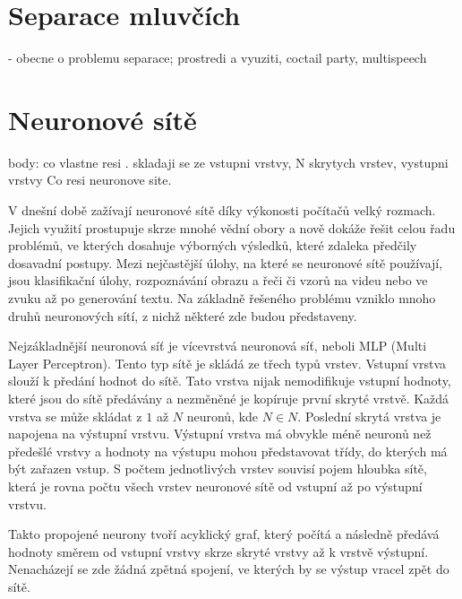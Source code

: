 
\chapter{Separace mluvčích}
\label{separacemluvcich}
- obecne o problemu separace; prostredi a vyuziti, coctail party, multispeech

\chapter{Neuronové sítě}
\label{neuronovky}
body: co vlastne resi . skladaji se ze vstupni vrstvy, N skrytych vrstev, vystupni vrstvy
Co resi neuronove site.

V dnešní době zažívají neuronové sítě díky výkonosti počítačů velký rozmach. Jejich využití prostupuje skrze mnohé vědní obory a nově dokáže řešit celou řadu problémů, ve kterých dosahuje výborných výsledků, které zdaleka předčily dosavadní postupy. Mezi nejčastější úlohy, na které se neuronové sítě používají, jsou klasifikační úlohy, rozpoznávání obrazu a řeči či vzorů na videu nebo ve zvuku až po generování textu. Na základně řešeného problému vzniklo mnoho druhů neuronových sítí, z nichž některé zde budou představeny.

Nejzákladnější neuronová síť je vícevrstvá neuronová síť, neboli MLP (Multi Layer Perceptron). Tento typ sítě je skládá ze třech typů vrstev. Vstupní vrstva slouží k předání hodnot do sítě. Tato vrstva nijak nemodifikuje vstupní hodnoty, které jsou do sítě předávány a nezměněné je kopíruje první skryté vrstvě. Každá vrstva se může skládat z $1$ až $N$ neuronů, kde $N \in N$. Poslední skrytá vrstva je napojena na výstupní vrstvu. Výstupní vrstva má obvykle méně neuronů než předešlé vrstvy a hodnoty na výstupu mohou představovat třídy, do kterých má být zařazen vstup. S počtem jednotlivých vrstev souvisí pojem hloubka sítě, která je rovna počtu všech vrstev neuronové sítě od vstupní až po výstupní vrstvu.

Takto propojené neurony tvoří acyklický graf, který počítá a následně předává hodnoty směrem od vstupní vrstvy skrze skryté vrstvy až k vrstvě výstupní. Nenacházejí se zde žádná zpětná spojení, ve kterých by se výstup vracel zpět do sítě.\cite{mitdeeplearning}

